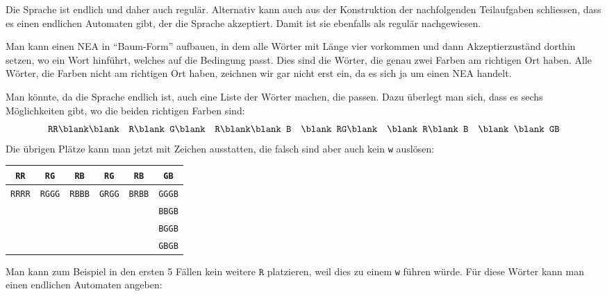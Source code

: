\begin{loesung}
\begin{teilaufgaben}
\item
Die Sprache ist endlich und daher auch regulär.
Alternativ kann auch aus der Konstruktion der nachfolgenden Teilaufgaben
schliessen, dass es einen endlichen Automaten gibt, der die Sprache
akzeptiert.
Damit ist sie ebenfalls als regulär nachgewiesen.
\item
Man kann einen NEA in ``Baum-Form'' aufbauen, in dem alle Wörter mit Länge
vier vorkommen  und dann Akzeptierzuständ dorthin setzen, wo ein Wort
hinführt, welches auf die Bedingung passt.
Dies sind die Wörter, die genau zwei Farben am richtigen Ort haben.
Alle Wörter, die Farben nicht am richtigen Ort haben, zeichnen wir gar
nicht erst ein, da es sich ja um einen NEA handelt.

Man könnte, da die Sprache endlich ist, auch eine Liste der Wörter machen,
die passen.
Dazu überlegt man sich, dass es sechs Möglichkeiten gibt, wo die beiden
richtigen Farben sind:
\[
\texttt{RR\blank\blank}
\quad
\texttt{R\blank G\blank}
\quad
\texttt{R\blank\blank B}
\quad
\texttt{\blank RG\blank}
\quad
\texttt{\blank R\blank B}
\quad
\texttt{\blank \blank GB}
\]
Die übrigen Plätze kann man jetzt mit Zeichen ausstatten, die falsch sind aber auch
kein \texttt{w} auslösen:
\begin{center}
\def\b{\blank}
\begin{tabular}{|cccccc|}
\hline
\texttt{RR\b\b}&\texttt{R\b G\b}&\texttt{R\b\b B}&\texttt{\b RG\b}&\texttt{\b R\b B}&\texttt{\b\b GB}\\
\hline
\texttt{RRRR}&\texttt{RGGG}&\texttt{RBBB}&\texttt{GRGG}&\texttt{BRBB}&\texttt{GGGB}\\
             &             &             &             &             &\texttt{BBGB}\\
             &             &             &             &             &\texttt{BGGB}\\
             &             &             &             &             &\texttt{GBGB}\\
\hline
\end{tabular}
\end{center}
Man kann zum Beispiel in den ersten 5 Fällen kein weitere $\texttt{R}$ platzieren,
weil dies zu einem \texttt{w} führen würde.
Für diese Wörter kann man einen endlichen Automaten angeben:
\begin{center}
\def\zustand#1{\draw #1 circle[radius=0.2];}
\def\azustand#1{\draw #1 circle[radius=0.2]; \draw #1 circle[radius=0.13];}
\def\pfeil#1#2#3{
	\draw[->,shorten >= 0.2cm,shorten <= 0.2cm] #1 -- #2;
	\node at ($0.5*#1+0.5*#2$) [above] {\texttt{#3}};
}
\end{center}
\end{teilaufgaben}
\end{loesung}
